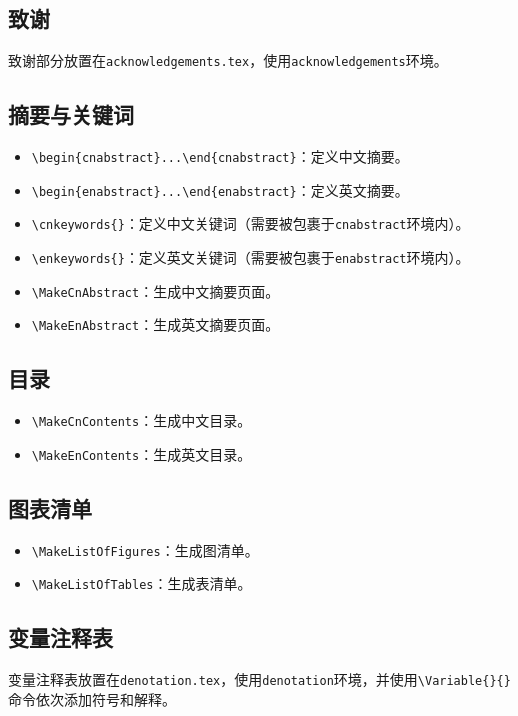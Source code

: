 \subsection{致谢}
致谢部分放置在\texttt{acknowledgements.tex}，使用\texttt{acknowledgements}环境。

\subsection{摘要与关键词}
\begin{itemize}[itemsep=2pt,topsep=5pt]
    \item \verb|\begin{cnabstract}...\end{cnabstract}|：定义中文摘要。
    \item \verb|\begin{enabstract}...\end{enabstract}|：定义英文摘要。
    \item \verb|\cnkeywords{}|：定义中文关键词（需要被包裹于\texttt{cnabstract}环境内）。
    \item \verb|\enkeywords{}|：定义英文关键词（需要被包裹于\texttt{enabstract}环境内）。
    \item \verb|\MakeCnAbstract|：生成中文摘要页面。
    \item \verb|\MakeEnAbstract|：生成英文摘要页面。
\end{itemize}

\subsection{目录}
\begin{itemize}[itemsep=2pt,topsep=5pt]
    \item \verb|\MakeCnContents|：生成中文目录。
    \item \verb|\MakeEnContents|：生成英文目录。
\end{itemize}

\subsection{图表清单}
\begin{itemize}[itemsep=2pt,topsep=5pt]
    \item \verb|\MakeListOfFigures|：生成图清单。
    \item \verb|\MakeListOfTables|：生成表清单。
\end{itemize}

\subsection{变量注释表}
变量注释表放置在\texttt{denotation.tex}，使用\texttt{denotation}环境，并使用\verb|\Variable{}{}|命令依次添加符号和解释。

